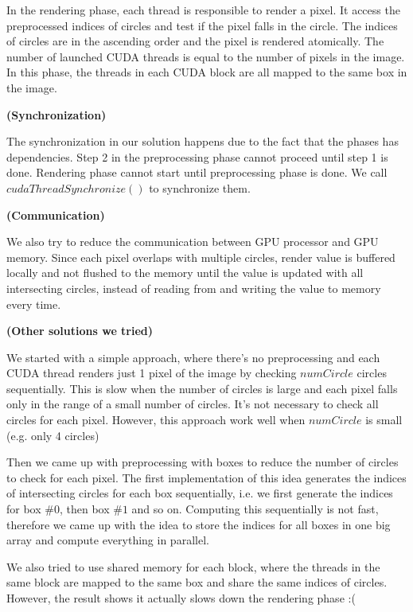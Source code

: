 \documentclass[11pt]{article}
\begin{document}
In the rendering phase, each thread is responsible to render a pixel. It access the preprocessed indices of circles and test if the pixel falls in the circle. The indices of circles are in the ascending order and the pixel is rendered atomically. The number of launched CUDA threads is equal to the number of pixels in the image. In this phase, the threads in each CUDA block are all mapped to the same box in the image.

\textbf{(Synchronization)}

The synchronization in our solution happens due to the fact that the phases has dependencies. Step 2 in the preprocessing phase cannot proceed until step 1 is done. Rendering phase cannot start until preprocessing phase is done. We call $cudaThreadSynchronize()$ to synchronize them.

\textbf{(Communication)}

We also try to reduce the communication between GPU processor and GPU memory. Since each pixel overlaps with multiple circles, render value is buffered locally and not flushed to the memory until the value is updated with all intersecting circles, instead of reading from and writing the value to memory every time.



\textbf{(Other solutions we tried)}

We started with a simple approach, where there's no preprocessing and each CUDA thread renders just 1 pixel of the image by checking $numCircle$ circles sequentially. This is slow when the number of circles is large and each pixel falls only in the range of a small number of circles. It's not necessary to check all circles for each pixel. However, this approach work well when $numCircle$ is small (e.g. only 4 circles)

Then we came up with preprocessing with boxes to reduce the number of circles to check for each pixel. The first implementation of this idea generates the indices of intersecting circles for each box sequentially, i.e. we first generate the indices for box $\#0$, then box $\#1$ and so on. Computing this sequentially is not fast, therefore we came up with the idea to store the indices for all boxes in one big array and compute everything in parallel.

We also tried to use shared memory for each block, where the threads in the same block are mapped to the same box and share the same indices of circles. However, the result shows it actually slows down the rendering phase :(

\clearpage
\end{document}

